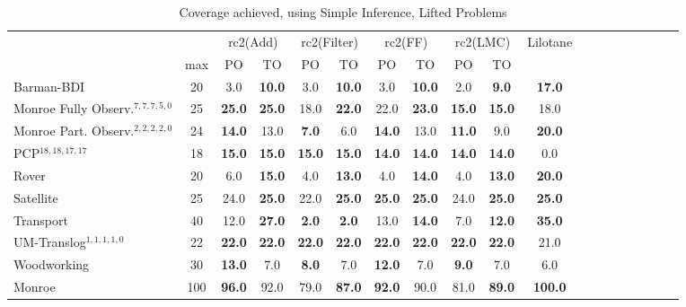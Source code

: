 \documentclass[letterpaper]{article} %
\begin{document}
\begin{table*}[h]
	\centering
	\caption{Coverage achieved, using Simple Inference, Lifted Problems}
\begin{tabular}{lccccccccccccccccccl} 
	\toprule 
	&& \multicolumn{2}{c}{rc2(Add)} & \multicolumn{2}{c}{rc2(Filter)} & \multicolumn{2}{c}{rc2(FF)} & \multicolumn{2}{c}{rc2(LMC)}  & \multicolumn{2}{c}{Lilotane}\\ 
	\cmidrule(lr){3-4} \cmidrule(lr){5-6} \cmidrule(lr){7-8} \cmidrule(lr){9-10} \cmidrule(lr){11-12}  
	& max &PO & TO & PO & TO & PO & TO & PO &\multicolumn{2}{c}{ TO  } \\ 
	\midrule 
	Barman-BDI & 20 & 3.0 & \textbf{10.0} & 3.0 & \textbf{10.0} & 3.0 & \textbf{10.0} & 2.0 & \textbf{9.0} &\multicolumn{2}{c}{ \textbf{17.0}  } \\ 
	Monroe Fully Observ.$^{7,7,7,5,0}$ & 25 & \textbf{25.0} & \textbf{25.0} & 18.0 & \textbf{22.0} & 22.0 & \textbf{23.0} & \textbf{15.0} & \textbf{15.0} &\multicolumn{2}{c}{ 18.0  } \\ 
	Monroe Part. Observ.$^{2,2,2,2,0}$ & 24 & \textbf{14.0} & 13.0 & \textbf{7.0} & 6.0 & \textbf{14.0} & 13.0 & \textbf{11.0} & 9.0 &\multicolumn{2}{c}{ \textbf{20.0}  } \\ 
	PCP$^{18,18,17,17}$ & 18 & \textbf{15.0} & \textbf{15.0} & \textbf{15.0} & \textbf{15.0} & \textbf{14.0} & \textbf{14.0} & \textbf{14.0} & \textbf{14.0} &\multicolumn{2}{c}{ 0.0  } \\ 
	Rover & 20 & 6.0 & \textbf{15.0} & 4.0 & \textbf{13.0} & 4.0 & \textbf{14.0} & 4.0 & \textbf{13.0} &\multicolumn{2}{c}{ \textbf{20.0}  } \\ 
	Satellite & 25 & 24.0 & \textbf{25.0} & 22.0 & \textbf{25.0} & \textbf{25.0} & \textbf{25.0} & 24.0 & \textbf{25.0} &\multicolumn{2}{c}{ \textbf{25.0}  } \\ 
	Transport & 40 & 12.0 & \textbf{27.0} & \textbf{2.0} & \textbf{2.0} & 13.0 & \textbf{14.0} & 7.0 & \textbf{12.0} &\multicolumn{2}{c}{ \textbf{35.0}  } \\ 
	UM-Translog$^{1,1,1,1,0}$ & 22 & \textbf{22.0} & \textbf{22.0} & \textbf{22.0} & \textbf{22.0} & \textbf{22.0} & \textbf{22.0} & \textbf{22.0} & \textbf{22.0} &\multicolumn{2}{c}{ 21.0  } \\ 
	Woodworking & 30 & \textbf{13.0} & 7.0 & \textbf{8.0} & 7.0 & \textbf{12.0} & 7.0 & \textbf{9.0} & 7.0 &\multicolumn{2}{c}{ 6.0  } \\ 
	\midrule 
	Monroe & 100 & \textbf{96.0} & 92.0 & 79.0 & \textbf{87.0} & \textbf{92.0} & 90.0 & 81.0 & \textbf{89.0} &\multicolumn{2}{c}{ \textbf{100.0}  } \\ 

\end{tabular}
\end{table*}
\end{document}
